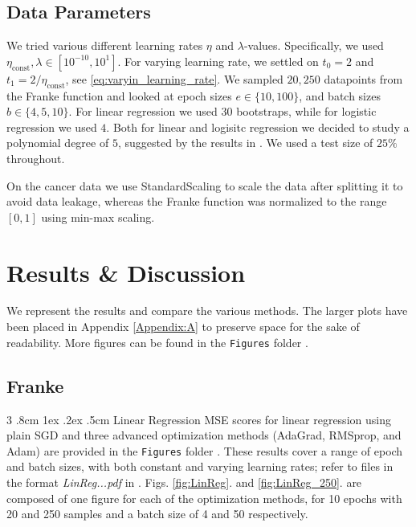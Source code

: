 \documentclass[%
reprint,s
amsmath,amssymb,
aps,
]{revtex4-2}
\makeatletter
\renewcommand{\subsubsection}{%
	\@startsection
	{subsubsection}%
	{3}%
	{\z@}%
	{.8cm \@plus1ex \@minus .2ex}%
	{.5cm}%
	{\normalfont\small\centering}%
}
\makeatother
\begin{document}
\subsection{Data Parameters}
We tried various different learning rates \(\eta\) and \(\lambda\)-values. Specifically, we used \(\eta_{\text{const}}, \lambda \in[10^{-10}, 10^{1}]\). For varying learning rate, we settled on \(t_0=2\) and \(t_{1} = 2 / \eta_{\text{const}} \), see \eqref{eq:varyin_learning_rate}. We sampled \(20, 250\) datapoints from the Franke function and looked at epoch sizes \(e \in \{10, 100\}\), and batch sizes \(b\in\{4, 5, 10\}\). For linear regression we used \(30\) bootstraps, while for logistic regression we used \(4\). Both for linear and logisitc regression we decided to study a polynomial degree of \(5\), suggested by the results in \cite{project1}. We used a test size of \(25\%\) throughout. 

On the cancer data we use StandardScaling to scale the data after splitting it to avoid data leakage, whereas the Franke function was normalized to the range $[0,1]$ using min-max scaling.


\section{Results \& Discussion}
We represent the results and compare the various methods. The larger plots have been placed in Appendix \ref{Appendix:A} to preserve space for the sake of readability. More figures can be found in the \texttt{Figures} folder \cite{extrafigures}.

\subsection{Franke}
\subsubsection{Linear Regression}
MSE scores for linear regression using plain SGD and three advanced optimization methods (AdaGrad, RMSprop, and Adam) are provided in the \texttt{Figures} folder \cite{extrafigures}. These results cover a range of epoch and batch sizes, with both constant and varying learning rates; refer to files in the format \emph{LinReg...pdf} in \cite{extrafigures}.  Figs. \ref{fig:LinReg}. and \ref{fig:LinReg_250}. are composed of one figure for each of the optimization methods, for 10 epochs with 20 and 250 samples and a batch size of 4 and 50 respectively. 
\end{document}
